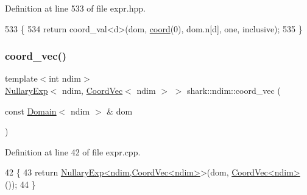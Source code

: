 Definition at line 533 of file expr.\+hpp.


\begin{DoxyCode}
533                                                                                                            
       \{
534             \textcolor{keywordflow}{return} coord\_val<d>(dom, \hyperlink{namespaceshark_a767a92d5dd82cb82266473bff42fa6d9}{coord}(0), dom.n[d], one, inclusive);
535         \}
\end{DoxyCode}
\hypertarget{namespaceshark_1_1ndim_a79746b40d6df669922d2577ae022d531}{}\label{namespaceshark_1_1ndim_a79746b40d6df669922d2577ae022d531} 
\subsubsection{\texorpdfstring{coord\+\_\+vec()}{coord\_vec()}\hspace{0.1cm}{\footnotesize\ttfamily [1/3]}}
{\footnotesize\ttfamily template$<$int ndim$>$ \\
\hyperlink{classshark_1_1ndim_1_1_nullary_exp}{Nullary\+Exp}$<$ ndim, \hyperlink{classshark_1_1ndim_1_1_coord_vec}{Coord\+Vec}$<$ ndim $>$ $>$ shark\+::ndim\+::coord\+\_\+vec (\begin{DoxyParamCaption}\item[{const \hyperlink{classshark_1_1ndim_1_1_domain}{Domain}$<$ ndim $>$ \&}]{dom }\end{DoxyParamCaption})}



Definition at line 42 of file expr.\+cpp.


\begin{DoxyCode}
42                                                                             \{
43     \textcolor{keywordflow}{return} \hyperlink{classshark_1_1ndim_1_1_nullary_exp}{NullaryExp<ndim,CoordVec<ndim>}>(dom, 
      \hyperlink{classshark_1_1ndim_1_1_coord_vec}{CoordVec<ndim>}());
44 \}
\end{DoxyCode}
\hypertarget{namespaceshark_1_1ndim_a6dc6b1b683a83691834cee32ab8a0bd7}{}\label{namespaceshark_1_1ndim_a6dc6b1b683a83691834cee32ab8a0bd7} 

